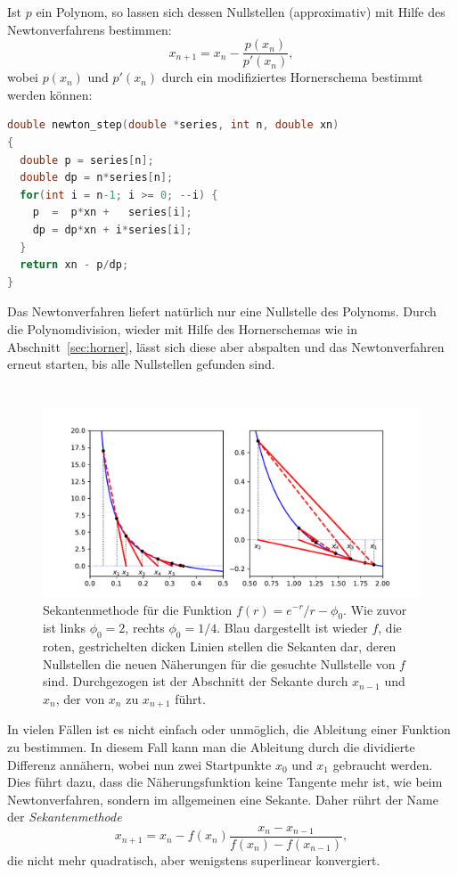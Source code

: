 Ist $p$ ein Polynom, so lassen sich dessen Nullstellen (approximativ)
mit Hilfe des Newtonverfahrens bestimmen:
\begin{equation}
  x_{n+1} = x_n - \frac{p(x_n)}{p'(x_n)},
\end{equation}
wobei $p(x_n)$ und $p'(x_n)$ durch ein modifiziertes Hornerschema
bestimmt werden können:
\begin{lstlisting}[language=C]
double newton_step(double *series, int n, double xn)
{
  double p = series[n];
  double dp = n*series[n];
  for(int i = n-1; i >= 0; --i) {
    p  =  p*xn +   series[i];
    dp = dp*xn + i*series[i];
  }
  return xn - p/dp;
}
\end{lstlisting}
Das Newtonverfahren liefert natürlich nur eine Nullstelle des
Polynoms. Durch die Polynomdivision, wieder mit Hilfe des
Hornerschemas wie in Abschnitt~\ref{sec:horner}, lässt sich diese
aber abspalten und das Newtonverfahren erneut starten, bis alle
Nullstellen gefunden sind.

\section{}

\begin{figure}
  \centering
  \includegraphics[width=\textwidth]{plots/sekanten}
  \caption{Sekantenmethode für die Funktion $f(r) = e^{-r}/r -
    \phi_0$. Wie zuvor ist links $\phi_0=2$, rechts $\phi_0=1/4$.
    Blau dargestellt ist wieder $f$, die roten, gestrichelten dicken
    Linien stellen die Sekanten dar, deren Nullstellen die neuen
    Näherungen für die gesuchte Nullstelle von $f$ sind. Durchgezogen
    ist der Abschnitt der Sekante durch $x_{n-1}$ und $x_n$, der von $x_n$
    zu $x_{n+1}$ führt.}
  \label{fig:sekanten}
\end{figure}

In vielen Fällen ist es nicht einfach oder unmöglich, die Ableitung
einer Funktion zu bestimmen. In diesem Fall kann man die Ableitung
durch die dividierte Differenz annähern, wobei nun zwei Startpunkte
$x_0$ und $x_1$ gebraucht werden. Dies führt dazu, dass die
Näherungsfunktion keine Tangente mehr ist, wie beim Newtonverfahren,
sondern im allgemeinen eine Sekante. Daher rührt der Name der
\emph{Sekantenmethode}
\begin{equation}
  x_{n+1} = x_n - f(x_n)\frac{x_n - x_{n-1}}{f(x_n) - f(x_{n-1})},
\end{equation}
die nicht mehr quadratisch, aber wenigstens superlinear konvergiert.

